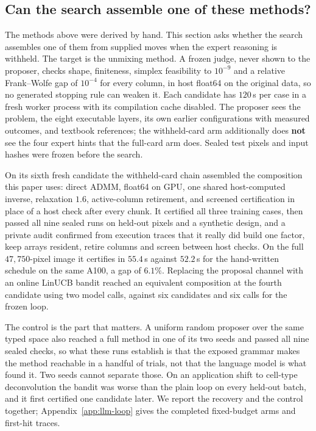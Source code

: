 \subsection{Can the search assemble one of these methods?}
\label{sec:exp:recover}

The methods above were derived by hand. This section asks whether the search
assembles one of them from supplied moves when the expert reasoning is withheld.
The target is the unmixing method. A frozen judge, never shown to the proposer,
checks shape, finiteness, simplex feasibility to $10^{-9}$ and a relative
Frank--Wolfe gap of $10^{-4}$ for every column, in host float64 on the original
data, so no generated stopping rule can weaken it. Each candidate has $120$\,s
per case in a fresh worker process with its compilation cache disabled. The
proposer sees the problem, the eight executable layers, its own earlier
configurations with measured outcomes, and textbook references; the
withheld-card arm additionally does \textbf{not} see the four expert hints that
the full-card arm does. Sealed test pixels and input hashes were frozen before
the search.

On its sixth fresh candidate the withheld-card chain assembled the composition
this paper uses: direct ADMM, float64 on GPU, one shared host-computed inverse,
relaxation $1.6$, active-column retirement, and screened certification in place
of a host check after every chunk. It certified all three training cases, then
passed all nine sealed runs on held-out pixels and a synthetic design, and a
private audit confirmed from execution traces that it really did build one
factor, keep arrays resident, retire columns and screen between host checks. On
the full $47{,}750$-pixel image it certifies in $55.4$\,s against $52.2$\,s for
the hand-written schedule on the same A100, a gap of $6.1\%$. Replacing the
proposal channel with an online LinUCB bandit
\citep{li2010linucb} reached an equivalent composition at the fourth candidate
using two model calls, against six candidates and six calls for the frozen loop.

The control is the part that matters. A uniform random proposer over the same
typed space also reached a full method in one of its two seeds and passed all
nine sealed checks, so what these runs establish is that the exposed grammar
makes the method reachable in a handful of trials, not that the language model
is what found it. Two seeds cannot separate those. On an application shift to
cell-type deconvolution the bandit was worse than the plain loop on every
held-out batch, and it first certified one candidate later. We report the
recovery and the control together; Appendix~\ref{app:llm-loop} gives the
completed fixed-budget arms and first-hit traces.

